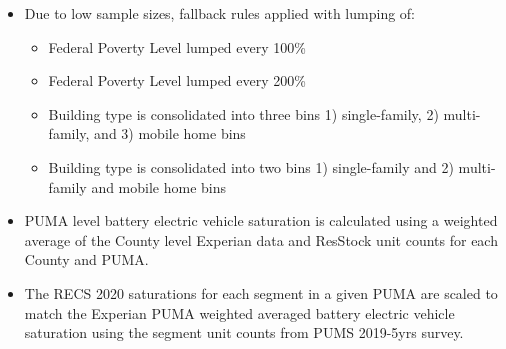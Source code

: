 \begin{itemize}
\item Due to low sample sizes, fallback rules applied with lumping of:
  \begin{itemize}
  \item Federal Poverty Level lumped every 100\%
  \item Federal Poverty Level lumped every 200\%
  \item Building type is consolidated into three bins 1) single-family, 2) multi-family, and 3) mobile home bins
  \item Building type is consolidated into two bins 1) single-family and 2) multi-family and mobile home bins
  \end{itemize}
\item PUMA level battery electric vehicle saturation is calculated using a weighted average of the County level Experian data and ResStock unit counts for each County and PUMA.
\item The RECS 2020 saturations for each segment in a given PUMA are scaled to match the Experian PUMA weighted averaged battery electric vehicle saturation using the segment unit counts from PUMS 2019-5yrs survey.
\end{itemize}
